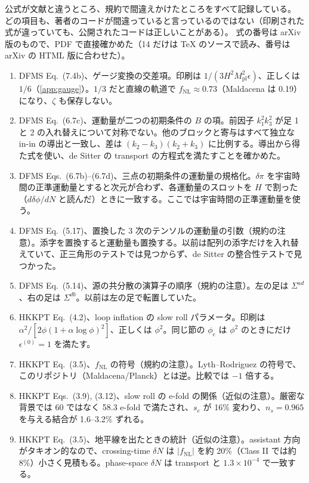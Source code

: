 \documentclass[a4paper,11pt]{ltjsarticle}
\newcommand{\Mpl}{M_{\mathrm{pl}}}
\newcommand{\fnl}{f_{\mathrm{NL}}}
\begin{document}
公式が文献と違うところ、規約で間違えかけたところをすべて記録している。
どの項目も、著者のコードが間違っていると言っているのではない（印刷された式が違っていても、公開されたコードは正しいことがある）。
式の番号は arXiv 版のもので、PDF で直接確かめた（14 だけは TeX のソースで読み、番号は arXiv の HTML 版に合わせた）。
\begin{enumerate}
\item DFMS Eq.~(7.4b)\cite{DFMS2016}、ゲージ変換の交差項。印刷は $1/(3H^2\Mpl^2\epsilon)$、正しくは $1/6$（\ref{app:gauge}）。$1/3$ だと直線の軌道で $\fnl\approx0.73$（Maldacena は 0.19）になり、$\zeta$ も保存しない。
\item DFMS Eq.~(6.7c)、運動量が二つの初期条件の $B$ の項。前因子 $k_1^2k_3^2$ が足 1 と 2 の入れ替えについて対称でない。他のブロックと寄与はすべて独立な in-in の導出と一致し、差は $(k_2-k_3)(k_2+k_3)$ に比例する。導出から得た式を使い、de Sitter の transport の方程式を満たすことを確かめた。
\item DFMS Eqs.~(6.7b)--(6.7d)、三点の初期条件の運動量の規格化。$\delta\pi$ を宇宙時間の正準運動量とすると次元が合わず、各運動量のスロットを $H$ で割った（$d\delta\phi/dN$ と読んだ）ときに一致する。ここでは宇宙時間の正準運動量を使う。
\item DFMS Eq.~(5.17)、置換した 3 次のテンソルの運動量の引数（規約の注意）。添字を置換すると運動量も置換する。以前は配列の添字だけを入れ替えていて、正三角形のテストでは見つからず、de Sitter の整合性テストで見つかった。
\item DFMS Eq.~(5.14)、源の共分散の演算子の順序（規約の注意）。左の足は $\Sigma^{ad}$、右の足は $\Sigma^{db}$。以前は左の足で転置していた。
\item HKKPT Eq.~(4.2)\cite{HKKPT2023}、loop inflation の slow roll パラメータ。印刷は $\alpha^2/[2\phi(1+\alpha\log\phi)^2]$、正しくは $\phi^2$。同じ節の $\phi_e$ は $\phi^2$ のときにだけ $\epsilon^{(0)}=1$ を満たす。
\item HKKPT Eq.~(3.5)、$\fnl$ の符号（規約の注意）。Lyth--Rodriguez の符号で、このリポジトリ（Maldacena/Planck）とは逆。比較では $-1$ 倍する。
\item HKKPT Eqs.~(3.9), (3.12)、slow roll の e-fold の関係（近似の注意）。厳密な背景では 60 ではなく 58.3 e-fold で満たされ、$s_e$ が 16\% 変わり、$n_s=0.965$ を与える結合が 1.6--3.2\% ずれる。
\item HKKPT Eq.~(3.5)、地平線を出たときの統計（近似の注意）。assistant 方向がタキオン的なので、crossing-time $\delta N$ は $|\fnl|$ を約 20\%（Class II では約 8\%）小さく見積もる。phase-space $\delta N$ は transport と $1.3\times10^{-4}$ で一致する。

\end{enumerate}
\end{document}
